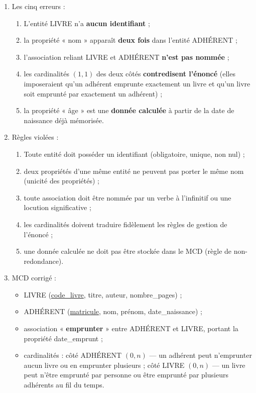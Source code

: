 \documentclass[11pt]{article}
\begin{document}
\begin{corrige}
\begin{enumerate}
\item Les cinq erreurs :
\begin{enumerate}
\item L'entité LIVRE n'a \textbf{aucun identifiant} ;
\item la propriété « nom » apparaît \textbf{deux fois} dans l'entité ADHÉRENT ;
\item l'association reliant LIVRE et ADHÉRENT \textbf{n'est pas nommée} ;
\item les cardinalités $(1,1)$ des deux côtés \textbf{contredisent l'énoncé} (elles imposeraient qu'un adhérent emprunte exactement un livre et qu'un livre soit emprunté par exactement un adhérent) ;
\item la propriété « âge » est une \textbf{donnée calculée} à partir de la date de naissance déjà mémorisée.
\end{enumerate}
\item Règles violées :
\begin{enumerate}
\item Toute entité doit posséder un identifiant (obligatoire, unique, non nul) ;
\item deux propriétés d'une même entité ne peuvent pas porter le même nom (unicité des propriétés) ;
\item toute association doit être nommée par un verbe à l'infinitif ou une locution significative ;
\item les cardinalités doivent traduire fidèlement les règles de gestion de l'énoncé ;
\item une donnée calculée ne doit pas être stockée dans le MCD (règle de non-redondance).
\end{enumerate}
\item MCD corrigé :
\begin{itemize}
\item LIVRE (\underline{code\_livre}, titre, auteur, nombre\_pages) ;
\item ADHÉRENT (\underline{matricule}, nom, prénom, date\_naissance) ;
\item association « \textbf{emprunter} » entre ADHÉRENT et LIVRE, portant la propriété date\_emprunt ;
\item cardinalités : côté ADHÉRENT $(0, n)$ — un adhérent peut n'emprunter aucun livre ou en emprunter plusieurs ; côté LIVRE $(0, n)$ — un livre peut n'être emprunté par personne ou être emprunté par plusieurs adhérents au fil du temps.
\end{itemize}
\end{enumerate}
\end{corrige}
\end{document}
